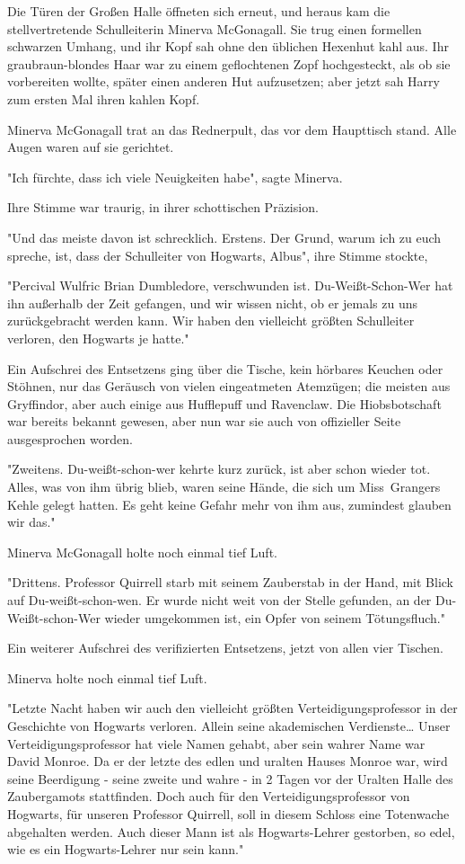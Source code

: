 {Die Türen der Großen Halle öffneten sich erneut, und heraus kam die stellvertretende Schulleiterin Minerva McGonagall. Sie trug einen formellen schwarzen Umhang, und ihr Kopf sah ohne den üblichen Hexenhut kahl aus. Ihr graubraun-blondes Haar war zu einem geflochtenen Zopf hochgesteckt, als ob sie vorbereiten wollte, später einen anderen Hut aufzusetzen; aber jetzt sah Harry zum ersten Mal ihren kahlen Kopf.

Minerva McGonagall trat an das Rednerpult, das vor dem Haupttisch stand. Alle Augen waren auf sie gerichtet.

"Ich fürchte, dass ich viele Neuigkeiten habe", sagte Minerva.

Ihre Stimme war traurig, in ihrer schottischen Präzision.

"Und das meiste davon ist schrecklich. Erstens. Der Grund, warum ich zu euch spreche, ist, dass der Schulleiter von Hogwarts, Albus", ihre Stimme stockte,

"Percival Wulfric Brian Dumbledore, verschwunden ist. Du-Weißt-Schon-Wer hat ihn außerhalb der Zeit gefangen, und wir wissen nicht, ob er jemals zu uns zurückgebracht werden kann. Wir haben den vielleicht größten Schulleiter verloren, den Hogwarts je hatte."

Ein Aufschrei des Entsetzens ging über die Tische, kein hörbares Keuchen oder Stöhnen, nur das Geräusch von vielen eingeatmeten Atemzügen; die meisten aus Gryffindor, aber auch einige aus Hufflepuff und Ravenclaw. Die Hiobsbotschaft war bereits bekannt gewesen, aber nun war sie auch von offizieller Seite ausgesprochen worden.

"Zweitens. Du-weißt-schon-wer kehrte kurz zurück, ist aber schon wieder tot. Alles, was von ihm übrig blieb, waren seine Hände, die sich um Miss~Grangers Kehle gelegt hatten. Es geht keine Gefahr mehr von ihm aus, zumindest glauben wir das."

Minerva McGonagall holte noch einmal tief Luft.

"Drittens. Professor Quirrell starb mit seinem Zauberstab in der Hand, mit Blick auf Du-weißt-schon-wen. Er wurde nicht weit von der Stelle gefunden, an der Du-Weißt-schon-Wer wieder umgekommen ist, ein Opfer von seinem Tötungsfluch."

Ein weiterer Aufschrei des verifizierten Entsetzens, jetzt von allen vier Tischen.

Minerva holte noch einmal tief Luft.

"Letzte Nacht haben wir auch den vielleicht größten Verteidigungsprofessor in der Geschichte von Hogwarts verloren. Allein seine akademischen Verdienste… Unser Verteidigungsprofessor hat viele Namen gehabt, aber sein wahrer Name war David Monroe. Da er der letzte des edlen und uralten Hauses Monroe war, wird seine Beerdigung - seine zweite und wahre - in 2 Tagen vor der Uralten Halle des Zaubergamots stattfinden. Doch auch für den Verteidigungsprofessor von Hogwarts, für unseren Professor Quirrell, soll in diesem Schloss eine Totenwache abgehalten werden. Auch dieser Mann ist als Hogwarts-Lehrer gestorben, so edel, wie es ein Hogwarts-Lehrer nur sein kann."

}
